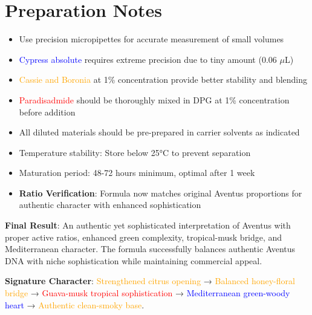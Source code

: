 \documentclass{article}
\begin{document}
\section{Preparation Notes}

\begin{itemize}
    \item Use precision micropipettes for accurate measurement of small volumes
    \item \textcolor{blue}{Cypress absolute} requires extreme precision due to tiny amount (0.06 $\mu$L)
    \item \textcolor{orange}{Cassie and Boronia} at 1\% concentration provide better stability and blending
    \item \textcolor{red}{Paradisadmide} should be thoroughly mixed in DPG at 1\% concentration before addition
    \item All diluted materials should be pre-prepared in carrier solvents as indicated
    \item Temperature stability: Store below 25°C to prevent separation
    \item Maturation period: 48-72 hours minimum, optimal after 1 week
    \item \textbf{Ratio Verification}: Formula now matches original Aventus proportions for authentic character with enhanced sophistication
\end{itemize}

\textbf{Final Result}: An authentic yet sophisticated interpretation of Aventus with proper active ratios, enhanced green complexity, tropical-musk bridge, and Mediterranean character. The formula successfully balances authentic Aventus DNA with niche sophistication while maintaining commercial appeal.

\textbf{Signature Character}: \textcolor{orange}{Strengthened citrus opening} → \textcolor{orange}{Balanced honey-floral bridge} → \textcolor{red}{Guava-musk tropical sophistication} → \textcolor{blue}{Mediterranean green-woody heart} → \textcolor{orange}{Authentic clean-smoky base}.
\end{document}
